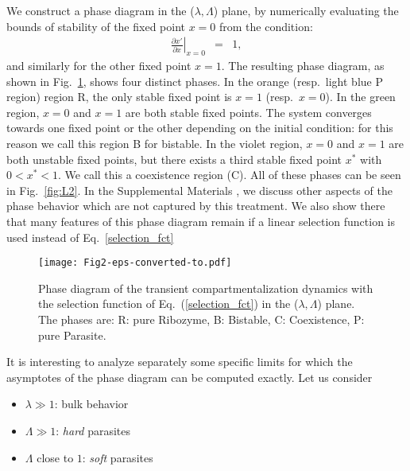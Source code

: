 \documentclass[twocolumn,showpacs,floatfix]{revtex4-1}
\newcommand{\bea}{\begin{eqnarray}}
\newcommand{\eea}{\end{eqnarray}}
\begin{document}
We construct a phase diagram in the ($\lambda,\Lambda$) plane, by numerically evaluating the bounds of stability of the fixed point $x=0$ from the condition:
\bea
\left. \frac{\partial x' }{\partial x} \right|_{x=0} &=& 1, 
\label{fixpoint}
\eea
and similarly for the other fixed point $x=1$.
The resulting phase diagram,  as shown in Fig.~\ref{fig:phase diag}, shows four distinct phases.
In the orange (resp.\ light blue P region) region R, the only stable fixed point is $x=1$ (resp.\ $x=0$). 
In the green region, $x=0$ and $x=1$ are both stable fixed points. The system converges towards one fixed point or the other  
depending on the initial condition: for this reason we call this region B for bistable.
In the violet region, $x=0$ and $x=1$ are both unstable fixed points, but there exists a third stable fixed point 
$x^*$ with $0<x^*<1$. We call this a coexistence region (C). All of these phases can be seen in Fig.~\ref{fig:L2}. 
In the Supplemental Materials \cite{SM}, 
we discuss other aspects of the phase behavior which are not captured by this treatment. We also
show there that many features of this phase diagram remain if a linear selection function is used instead of 
Eq.~\eqref{selection_fct}


\begin{figure}[htb]
\begin{center}
\texttt{[image: Fig2-eps-converted-to.pdf]}
\end{center}
\caption{Phase diagram of the transient compartmentalization dynamics with the selection function of Eq.~(\ref{selection_fct}) in
 the ($\lambda,\Lambda$) plane. The phases are: R: pure Ribozyme, B: Bistable, C: Coexistence, P: pure Parasite.}
\label{fig:phase diag}
\end{figure}


It is interesting to analyze separately some specific limits for which the 
asymptotes of the phase diagram can be computed exactly. Let us consider  
\begin{itemize}
 \item $\lambda \gg 1$: bulk behavior
 \item $\Lambda \gg 1$: {\it hard} parasites
 \item $\Lambda$ close to $1$: {\it soft} parasites
\end{itemize}
\end{document}
